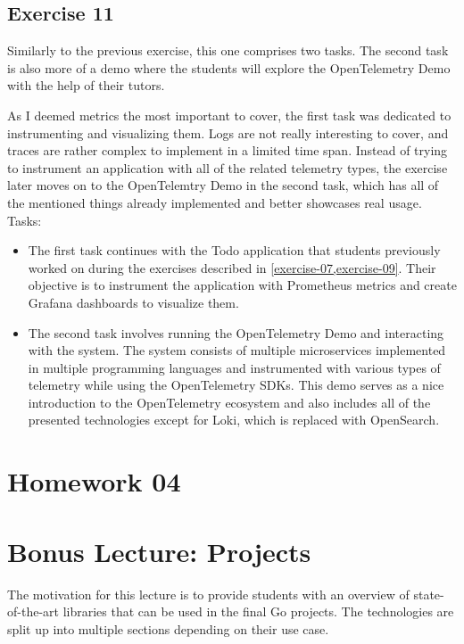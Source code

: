\documentclass[
  digital,
  color,
  oneside,
  nosansbold,
  nocolorbold,
  nolof,
  nolot,
]{fithesis4}
\begin{document}
\subsection{Exercise 11}\label{exercise-11}

Similarly to the previous exercise, this one comprises two tasks. The second task is also more of a demo where the students will explore the OpenTelemetry Demo\cite{open-telemetry-demo} with the help of their tutors.

As I deemed metrics the most important to cover, the first task was dedicated to instrumenting and visualizing them. Logs are not really interesting to cover, and traces are rather complex to implement in a limited time span. Instead of trying to instrument an application with all of the related telemetry types, the exercise later moves on to the OpenTelemtry Demo in the second task, which has all of the mentioned things already implemented and better showcases real usage. \\

\noindent
Tasks:
\begin{itemize}
    \item The first task continues with the Todo application that students previously worked on during the exercises described in \cref{exercise-07,exercise-09}. Their objective is to instrument the application with Prometheus metrics and create Grafana dashboards to visualize them.
    \item The second task involves running the OpenTelemetry Demo and interacting with the system. The system consists of multiple microservices implemented in multiple programming languages and instrumented with various types of telemetry while using the OpenTelemetry SDKs. This demo serves as a nice introduction to the OpenTelemetry ecosystem and also includes all of the presented technologies except for Loki, which is replaced with OpenSearch\cite{opensearch}.
\end{itemize}

\section{Homework 04}

\section{Bonus Lecture: Projects} \label{lecture-projects}

The motivation for this lecture is to provide students with an overview of state-of-the-art libraries that can be used in the final Go projects. The technologies are split up into multiple sections depending on their use case.
\end{document}
